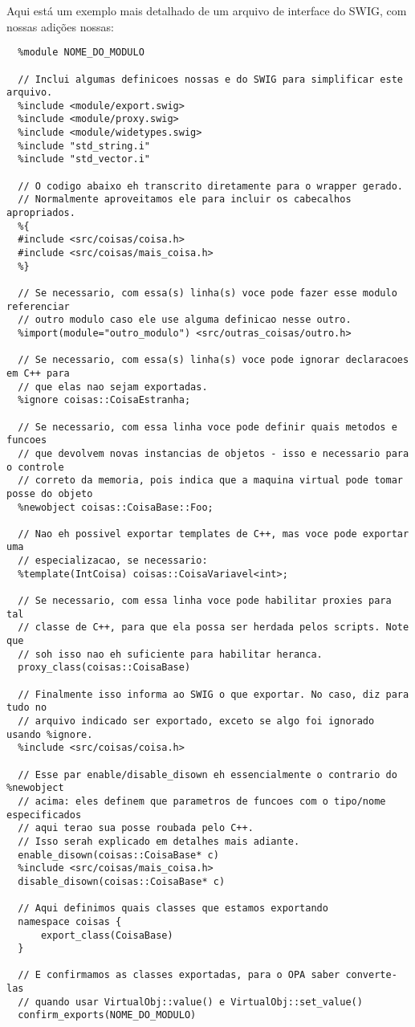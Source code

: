   Aqui está um exemplo mais detalhado de um arquivo de interface do SWIG, com nossas 
  adições nossas:
  \begin{lstlisting}
  %module NOME_DO_MODULO

  // Inclui algumas definicoes nossas e do SWIG para simplificar este arquivo.
  %include <module/export.swig>
  %include <module/proxy.swig>
  %include <module/widetypes.swig>
  %include "std_string.i"
  %include "std_vector.i"
  
  // O codigo abaixo eh transcrito diretamente para o wrapper gerado.
  // Normalmente aproveitamos ele para incluir os cabecalhos apropriados.
  %{
  #include <src/coisas/coisa.h>
  #include <src/coisas/mais_coisa.h>
  %}

  // Se necessario, com essa(s) linha(s) voce pode fazer esse modulo referenciar 
  // outro modulo caso ele use alguma definicao nesse outro.
  %import(module="outro_modulo") <src/outras_coisas/outro.h>

  // Se necessario, com essa(s) linha(s) voce pode ignorar declaracoes em C++ para 
  // que elas nao sejam exportadas.
  %ignore coisas::CoisaEstranha;
  
  // Se necessario, com essa linha voce pode definir quais metodos e funcoes
  // que devolvem novas instancias de objetos - isso e necessario para o controle 
  // correto da memoria, pois indica que a maquina virtual pode tomar posse do objeto
  %newobject coisas::CoisaBase::Foo;
  
  // Nao eh possivel exportar templates de C++, mas voce pode exportar uma 
  // especializacao, se necessario:
  %template(IntCoisa) coisas::CoisaVariavel<int>;

  // Se necessario, com essa linha voce pode habilitar proxies para tal 
  // classe de C++, para que ela possa ser herdada pelos scripts. Note que
  // soh isso nao eh suficiente para habilitar heranca.
  proxy_class(coisas::CoisaBase)

  // Finalmente isso informa ao SWIG o que exportar. No caso, diz para tudo no
  // arquivo indicado ser exportado, exceto se algo foi ignorado usando %ignore.
  %include <src/coisas/coisa.h>
  
  // Esse par enable/disable_disown eh essencialmente o contrario do %newobject
  // acima: eles definem que parametros de funcoes com o tipo/nome especificados
  // aqui terao sua posse roubada pelo C++. 
  // Isso serah explicado em detalhes mais adiante.
  enable_disown(coisas::CoisaBase* c)
  %include <src/coisas/mais_coisa.h>
  disable_disown(coisas::CoisaBase* c)

  // Aqui definimos quais classes que estamos exportando
  namespace coisas {
      export_class(CoisaBase)
  }

  // E confirmamos as classes exportadas, para o OPA saber converte-las
  // quando usar VirtualObj::value() e VirtualObj::set_value()
  confirm_exports(NOME_DO_MODULO)
  \end{lstlisting}
  
